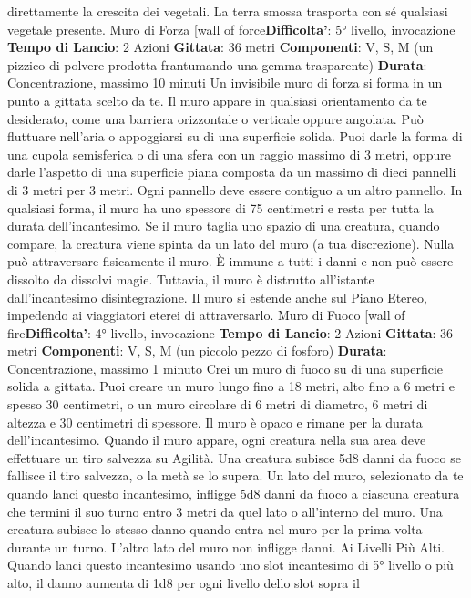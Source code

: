 \begin{multicols}{2}
direttamente la crescita dei vegetali. La terra smossa
trasporta con sé qualsiasi vegetale presente.
Muro di Forza
[wall of force\textbf{Difficolta'}:
5° livello, invocazione
\textbf{Tempo di Lancio}: 2 Azioni
\textbf{Gittata}: 36 metri
\textbf{Componenti}: V, S, M (un pizzico di polvere prodotta
frantumando una gemma trasparente)
\textbf{Durata}: Concentrazione, massimo 10 minuti
Un invisibile muro di forza si forma in un punto a gittata
scelto da te. Il muro appare in qualsiasi orientamento
da te desiderato, come una barriera orizzontale o
verticale oppure angolata. Può fluttuare nell’aria o
appoggiarsi su di una superficie solida. Puoi darle la
forma di una cupola semisferica o di una sfera con un
raggio massimo di 3 metri, oppure darle l’aspetto di una
superficie piana composta da un massimo di dieci
pannelli di 3 metri per 3 metri. Ogni pannello deve
essere contiguo a un altro pannello. In qualsiasi forma,
il muro ha uno spessore di 75 centimetri e resta per
tutta la durata dell’incantesimo. Se il muro taglia uno
spazio di una creatura, quando compare, la creatura
viene spinta da un lato del muro (a tua discrezione).
Nulla può attraversare fisicamente il muro. È immune a
tutti i danni e non può essere dissolto da dissolvi magie.
Tuttavia, il muro è distrutto all’istante dall’incantesimo
disintegrazione. Il muro si estende anche sul Piano
Etereo, impedendo ai viaggiatori eterei di attraversarlo.
Muro di Fuoco
[wall of fire\textbf{Difficolta'}:
4° livello, invocazione
\textbf{Tempo di Lancio}: 2 Azioni
\textbf{Gittata}: 36 metri
\textbf{Componenti}: V, S, M (un piccolo pezzo di fosforo)
\textbf{Durata}: Concentrazione, massimo 1 minuto
Crei un muro di fuoco su di una superficie solida a
gittata. Puoi creare un muro lungo fino a 18 metri, alto
fino a 6 metri e spesso 30 centimetri, o un muro
circolare di 6 metri di diametro, 6 metri di altezza e 30
centimetri di spessore. Il muro è opaco e rimane per la
durata dell’incantesimo.
Quando il muro appare, ogni creatura nella sua area
deve effettuare un tiro salvezza su Agilità. Una
creatura subisce 5d8 danni da fuoco se fallisce il tiro
salvezza, o la metà se lo supera.
Un lato del muro, selezionato da te quando lanci questo
incantesimo, infligge 5d8 danni da fuoco a ciascuna
creatura che termini il suo turno entro 3 metri da quel
lato o all’interno del muro. Una creatura subisce lo
stesso danno quando entra nel muro per la prima volta
durante un turno. L’altro lato del muro non infligge
danni.
Ai Livelli Più Alti. Quando lanci questo incantesimo
usando uno slot incantesimo di 5° livello o più alto, il
danno aumenta di 1d8 per ogni livello dello slot sopra il

\end{multicols}
